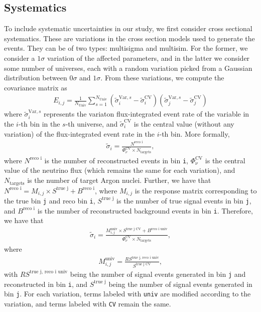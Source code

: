 \documentclass{article}
\begin{document}
\clearpage

\subsection{Systematics}

To include systematic uncertainties in our study, we first consider cross sectional systematics.
These are variations in the cross section models used to generate the events. They can be of two types:
multisigma and multisim. For the former, we consider a $1\sigma$ variation of the affected parameters, 
and in the latter we consider some number of universes, each with a random variation picked from a 
Gaussian distribution between $0\sigma$ and $1\sigma$. From these variations, we compute the covariance matrix 
as 
\begin{align}
    E_{i,j} = \frac{1}{N_{\text{Univ}}} \sum_{s = 1}^{N_{\text{Univ}}} (\tilde{\sigma}_i^{\text{Var}, s} - \tilde{\sigma}_i^\text{CV})(\tilde{\sigma}_j^{\text{Var}, s} - \tilde{\sigma}_j^\text{CV})
\end{align}
where $\tilde{\sigma}_i^{\text{Var}, s}$ represents the variaton flux-integrated event rate of the variable in the $i$-th 
bin in the $s$-th universe, and $\tilde{\sigma}_i^\text{CV}$ is the central value (without any variation) 
of the flux-integrated event rate in the $i$-th bin. More formally,
\begin{align}
    \tilde{\sigma}_i = \frac{N^\text{reco i}}{\Phi_\nu^\text{CV} \times N_{\text{targets}}},
\end{align}
where $N^\text{reco i}$ is the number of reconstructed events in bin \verb|i|, 
$\Phi_\nu^\text{CV}$ is the central value of the neutrino flux (which remains the same for each variation),
and $N_{\text{targets}}$ is the number of target Argon nuclei. Further, we have that 
$N^\text{reco i} = M_{i,j} \times S^{\text{true j}} + B^{\text{reco i}}$, 
where $M_{i,j}$ is the response matrix corresponding to the true bin \verb|j| and reco 
bin \verb|i|, $S^{\text{true j}}$ is the number of true signal events in bin \verb|j|, and
$B^{\text{reco i}}$ is the number of reconstructed background events in bin \verb|i|. Therefore, we 
have that 
\begin{align}
    \tilde{\sigma}_i = \frac{M^{\text{univ}}_{i,j} \times S^{\text{true j CV}} + B^{\text{reco i univ}}}{\Phi_\nu^\text{CV} \times N_{\text{targets}}},
\end{align}
where 
\begin{align}
    M_{i,j}^{\text{univ}} = \frac{RS^{\text{true j, reco i univ}}}{S^{\text{true j CV}}},
\end{align}
with $RS^{\text{true j, reco i univ}}$ being the number of signal events generated in bin \verb|j| and reconstructed in bin \verb|i|,
and $S^{\text{true j}}$ being the number of signal events generated in bin \verb|j|. For each variation, 
terms labeled with \verb|univ| are modified according to the variation, and terms labeled with \verb|CV| remain the same.
\end{document}
